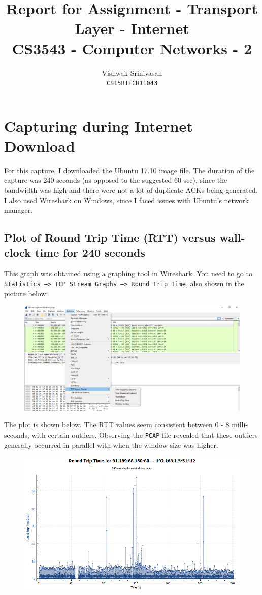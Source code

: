 \documentclass{article}
\title{Report for Assignment - Transport Layer - Internet\\
CS3543 - Computer Networks - 2}
\author{Vishwak Srinivasan\\
\texttt{CS15BTECH11043}}
\date{}
\begin{document}
\maketitle 

\section{Capturing during Internet Download}
\begin{flushleft}
For this capture, I downloaded the \href{http://releases.ubuntu.com/17.10/ubuntu-17.10.1-desktop-amd64.iso}{Ubuntu 17.10 image file}. The duration of the capture was 240 seconds (as opposed to the suggested 60 sec), since the bandwidth was high and there were not a lot of duplicate ACKs being generated. I also used Wireshark on Windows, since I faced issues with Ubuntu's network manager.
\end{flushleft}

\subsection{Plot of Round Trip Time (RTT) versus wall-clock time for 240 seconds}
\begin{flushleft}
This graph was obtained using a graphing tool in Wireshark. You need to go to \texttt{Statistics --> TCP Stream Graphs --> Round Trip Time}, also shown in the picture below:
\begin{figure}[H]
\centering
\includegraphics[width=0.6\linewidth]{RTT-Window-size-capture-process.png}
\end{figure}

The plot is shown below. The RTT values seem consistent between 0 - 8 milli-seconds, with certain outliers. Observing the \texttt{PCAP} file revealed that these outliers generally occurred in parallel with when the window size was higher.
\begin{figure}[H]
\centering
\includegraphics[width=0.65\linewidth]{RTT-variation-240-sec-capture-Windows-time.png}
\end{figure}
\end{flushleft}
\end{document}

